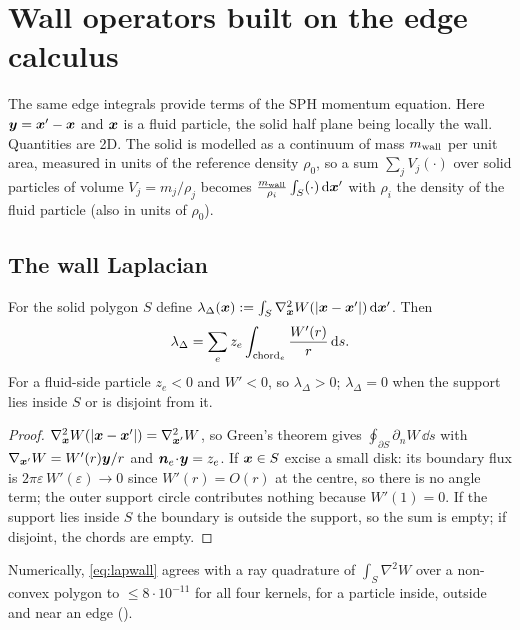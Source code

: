 \section{Wall operators built on the edge calculus}\label{sec:wall}

The same edge integrals provide terms of the SPH momentum equation. Here $\bm y=\bm x'-\bm x$ and $\bm x$ is a fluid particle,
the solid half plane being locally the wall. Quantities are 2D. The solid is modelled as a continuum of mass $m_{\rm wall}$ per unit area, measured in units of
the reference density $\rho_0$, so a sum $\sum_jV_j(\cdot)$ over solid particles of volume $V_j=m_j/\rho_j$ becomes $\frac{m_{\rm wall}}{\rho_i}\int_S(\cdot)\,\mathrm{d}\bm x'$ with $\rho_i$ the density
of the fluid particle (also in units of $\rho_0$).

\subsection{The wall Laplacian}
\begin{proposition}\label{prop:lapwall}
For the solid polygon $S$ define $\lambda_\Delta(\bm x):=\int_S\nabla^2_{\bm x}W(|\bm x-\bm x'|)\,\mathrm{d}\bm x'$. Then
\begin{equation}\label{eq:lapwall}
 \lambda_\Delta=\sum_ez_e\int_{\mathrm{chord}_e}\frac{W'(r)}{r}\,\mathrm{d} s.
\end{equation}
For a fluid-side particle $z_e<0$ and $W'<0$, so $\lambda_\Delta>0$; $\lambda_\Delta=0$ when the support lies inside $S$ or is disjoint from it.
\end{proposition}
\begin{proof}
$\nabla_{\bm x}^2W(|\bm x-\bm x'|)=\nabla_{\bm x'}^2W$, so Green's theorem gives $\oint_{\partial S}\partial_nW\,\dd s$ with $\nabla_{\bm x'}W=W'(r)\bm y/r$ and $\bm n_e\!\cdot\!\bm y=z_e$.
If $\bm x\in S$ excise a small disk: its boundary flux is $2\pi\varepsilon\,W'(\varepsilon)\to0$ since $W'(r)=O(r)$ at the centre, so there is no angle term;
the outer support circle contributes nothing because $W'(1)=0$. If the support lies inside $S$ the boundary is outside the support, so the sum is empty; if disjoint, the chords are empty.
\end{proof}
Numerically, \cref{eq:lapwall} agrees with a ray quadrature of $\int_S\nabla^2W$ over a non-convex polygon to $\le8\cdot10^{-11}$ for all four kernels, for a particle inside, outside and near an edge
(). 

